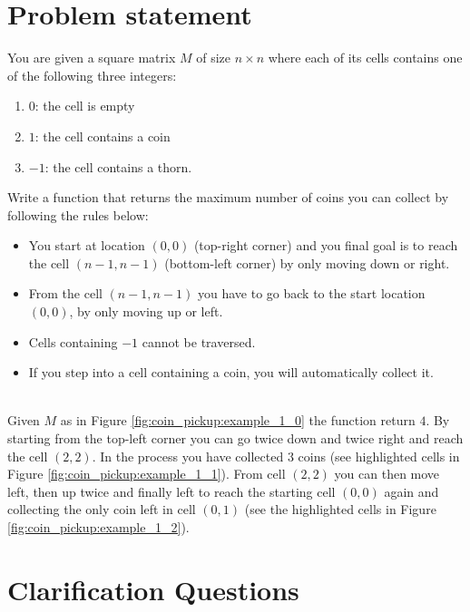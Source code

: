 \section{Problem statement}
\begin{exercise}
\label{example:coin_pickup:exercice1}
You are given a square matrix $M$ of size $n \times n$ where each of its cells contains one of the following three integers:
\begin{enumerate}
	\item $0$: the cell is empty
	\item $1$: the cell contains a coin
	\item $-1$: the cell contains a thorn. 
\end{enumerate}

Write a function that returns the maximum number of coins you can collect by following the rules below:
\begin{itemize}
	\item You start at location $(0,0)$ (top-right corner) and you final goal is to reach the cell $(n-1,n-1)$ (bottom-left corner) by only moving down or right.
	\item From the cell $(n-1,n-1)$ you have to go back to the start location $(0,0)$, by only moving up or left.
	\item Cells containing $-1$ cannot be traversed.
	\item If you step into a cell containing a coin, you will automatically collect it.
\end{itemize}

	\begin{example}
		\label{example:coin_pickup:example1}
		\hfill \\
		Given $M$  as in Figure \ref{fig:coin_pickup:example_1_0} the function return $4$.
		By starting from the top-left corner you can go twice down and twice right and reach the cell $(2,2)$. In the process
		you have collected $3$ coins (see highlighted cells in Figure \ref{fig:coin_pickup:example_1_1}).
		From cell $(2,2)$ you can then move left, then up twice and finally left to reach the starting cell $(0,0)$ again
		 and collecting the only coin left in cell $(0,1)$ (see the highlighted cells in Figure \ref{fig:coin_pickup:example_1_2}). 
	\end{example}

\end{exercise}

\section{Clarification Questions}


